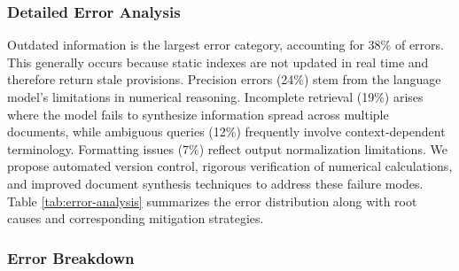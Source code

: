 \documentclass{article}
\newcommand{\revised}[1]{\textcolor{blue}{#1}}
\newcommand{\revised}[1]{#1}
\begin{document}
\subsubsection{Detailed Error Analysis}

Outdated information is the largest error category, accounting for 38\% of errors. This
generally occurs because static indexes are not updated in real time and therefore
return stale provisions. Precision errors (24\%) stem from the language model's
limitations in numerical reasoning. Incomplete retrieval (19\%) arises where the model
fails to synthesize information spread across multiple documents, while ambiguous
queries (12\%) frequently involve context-dependent terminology. Formatting issues
(7\%) reflect output normalization limitations. We propose automated version control,
rigorous verification of numerical calculations, and improved document synthesis
techniques to address these failure modes. Table \ref{tab:error-analysis} summarizes the
error distribution along with root causes and corresponding mitigation strategies.

\begin{table}[!h]
\caption{Error analysis with root causes \revised{(N = 100 errors)}}
\centering
{}
\label{tab:error-analysis}
\end{table}

\subsubsection{Error Breakdown}
\end{document}
